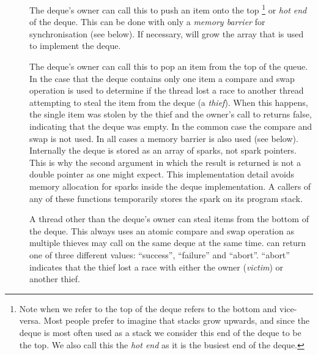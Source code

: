 \begin{description}

    \item[]
    The deque's owner can call this to push an item onto the
    top%
\footnote{
        Note when we refer to the top of the deque
        \citet{Chase_2005_wsdeque} refers to the bottom and vice-versa.
        Most people prefer to imagine that stacks grow upwards,
        and since the deque is most often used as a stack we consider this
        end of the deque to be the top.
        We also call this the \emph{hot end} as it is the busiest end of the
        deque.}
    or \emph{hot end} of the deque.
    This can be done with only a \emph{memory barrier} for synchronisation
    (see below).
    If necessary,
    \push will grow the array that is used to implement the
    deque.

    \item[]
    The deque's owner can call this to pop an item from the top of the
    queue.
    In the case that the deque contains only one item a compare and swap
    operation is used to determine if the thread lost a race to another
    thread attempting to steal the item from the deque (a \emph{thief}).
    When this happens, the single item was stolen by the thief and the
    owner's call to \pop returns false,
    indicating that the deque was empty.
    In the common case the compare and swap is not used.
    In all cases a memory barrier is also used (see below).
    Internally the deque is stored as an array of sparks, not spark
    pointers.
    This is why the second argument in which the result is returned is not a
    double pointer as one might expect.
    This implementation detail avoids memory allocation for sparks inside
    the deque implementation.
    A callers of any of these functions temporarily stores the spark on
    its program stack.

    \item[]
    A thread other than the deque's owner can steal
    items from the bottom of the deque.
    This always uses an atomic compare and swap operation as multiple
    thieves may call \steal on the same deque at the same time.
    \steal can return one of three different values:
    ``success'', ``failure'' and ``abort''.
    ``abort'' indicates that the thief lost a race with either the owner
    (\emph{victim}) or another thief.

\end{description}

